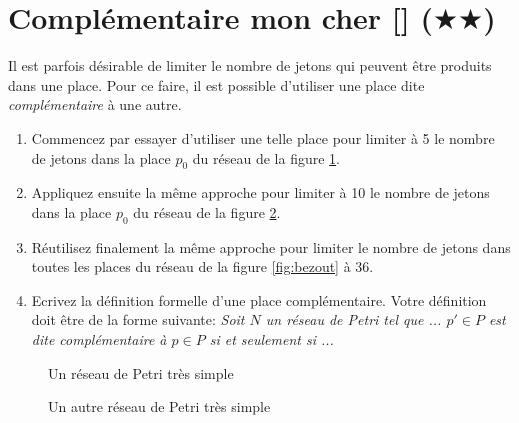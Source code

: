 \documentclass[a4paper, titlepage]{article}
\numberwithin{figure}{section}
\numberwithin{table}{section}
\begin{document}
  \section{Complémentaire mon cher [\Keyboard] ($\bigstar\bigstar$)}
  Il est parfois désirable de limiter le nombre de jetons qui peuvent être produits dans une place.
  Pour ce faire, il est possible d'utiliser une place dite \emph{complémentaire} à une autre.

  \begin{enumerate}
      \item  Commencez par essayer d'utiliser une telle place pour limiter à 5 le nombre de jetons dans la place $p_0$ du réseau de la figure \ref{fig:simple_net}.
      \item Appliquez ensuite la même approche pour limiter à 10 le nombre de jetons dans la place $p_0$ du réseau de la figure \ref{fig:simple_net2}. 
      \item Réutilisez finalement la même approche pour limiter le nombre de jetons dans toutes les places du réseau de la figure \ref{fig:bezout} à  36.
      \item Ecrivez la définition formelle d'une place complémentaire.
            Votre définition doit être de la forme suivante:
            \emph{Soit $N$ un réseau de Petri tel que ... $p'\in P$ est dite complémentaire à $p \in P$ si et seulement si ...}
  \end{enumerate}  

  \begin{figure}[h]
      \centering
      \caption{Un réseau de Petri très simple}
      \label{fig:simple_net}
    \end{figure}

    \begin{figure}[h]
      \centering
      \caption{Un autre réseau de Petri très simple}
      \label{fig:simple_net2}
    \end{figure}
\end{document}
